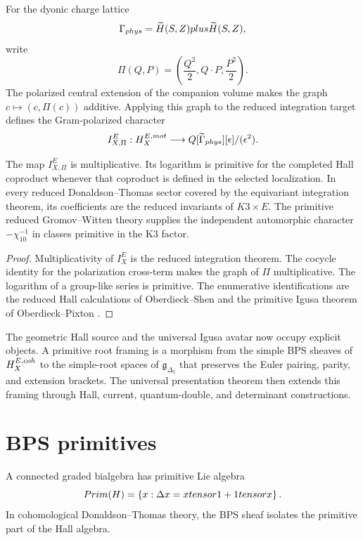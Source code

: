 For the dyonic charge lattice
\[
 \Gamma_{phys}
 =\widetilde H(S,Z)plus\widetilde H(S,Z),
\]
write
\[
 \Pi(Q,P)=\left(\frac{Q^2}{2},Q\cdot P,\frac{P^2}{2}\right).
\]
The polarized central extension of the companion volume makes the graph $c\mapsto(c,\Pi(c))$ additive.  Applying this graph to the reduced integration target defines the Gram-polarized character
\[
 I_{X,\Pi}^E:
 H_X^{E,mot}
 \longrightarrow
 Q[\widetilde\Gamma_{phys}][\epsilon]/(\epsilon^2).
\]

\begin{theorem}
The map $I_{X,\Pi}^E$ is multiplicative.  Its logarithm is primitive for the completed Hall coproduct whenever that coproduct is defined in the selected localization.  In every reduced Donaldson--Thomas sector covered by the equivariant integration theorem, its coefficients are the reduced invariants of $K3\times E$.  The primitive reduced Gromov--Witten theory supplies the independent automorphic character $-\chi_{10}^{-1}$ in classes primitive in the K3 factor.
\end{theorem}
\begin{proof}
Multiplicativity of $I_X^E$ is the reduced integration theorem.  The cocycle identity for the polarization cross-term makes the graph of $\Pi$ multiplicative.  The logarithm of a group-like series is primitive.  The enumerative identifications are the reduced Hall calculations of Oberdieck--Shen and the primitive Igusa theorem of Oberdieck--Pixton \cite{OberdieckShen,OP}.
\end{proof}

The geometric Hall source and the universal Igusa avatar now occupy explicit objects.  A primitive root framing is a morphism from the simple BPS sheaves of $H_X^{E,coh}$ to the simple-root spaces of $\mathfrak g_{\Delta_5}$ that preserves the Euler pairing, parity, and extension brackets.  The universal presentation theorem then extends this framing through Hall, current, quantum-double, and determinant constructions.

\chapter{BPS primitives}
A connected graded bialgebra has primitive Lie algebra
\[
 Prim(H)=\left\{x:\Delta x=xtensor1+1tensor x\right\}.
\]
In cohomological Donaldson--Thomas theory, the BPS sheaf isolates the primitive part of the Hall algebra.

